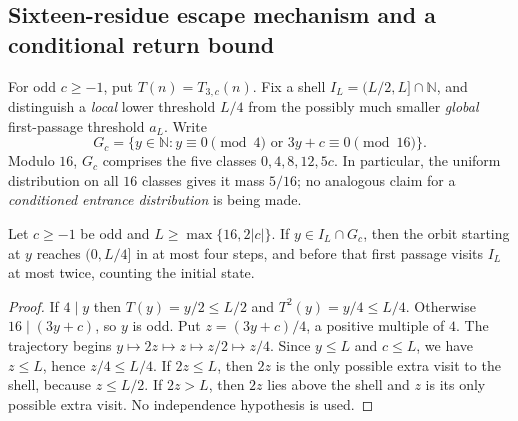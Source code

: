 \subsection{Sixteen-residue escape mechanism and a conditional return bound}
\label{subsec:mod16-escape-candidate}
For odd $c\ge-1$, put $T(n)=T_{3,c}(n)$. Fix a shell
$I_L=(L/2,L]\cap\mathbb N$, and distinguish a \emph{local} lower
threshold $L/4$ from the possibly much smaller \emph{global}
first-passage threshold $a_L$. Write
\[
 G_c=\{y\in\mathbb N:y\equiv0\pmod4\text{ or }
                 3y+c\equiv0\pmod{16}\}.
\]
Modulo $16$, $G_c$ comprises the five classes
$0,4,8,12,5c$. In particular, the uniform distribution on all
$16$ classes gives it mass $5/16$; no analogous claim for a
\emph{conditioned entrance distribution} is being made.

\begin{proposition}
\label{prop:mod16-local-escape-candidate}
Let $c\ge-1$ be odd and $L\ge\max\{16,2|c|\}$. If
$y\in I_L\cap G_c$, then the orbit starting at $y$ reaches
$(0,L/4]$ in at most four steps, and before that first passage
visits $I_L$ at most twice, counting the initial state.
\end{proposition}
\begin{proof}
If $4\mid y$ then $T(y)=y/2\le L/2$ and
$T^2(y)=y/4\le L/4$. Otherwise $16\mid(3y+c)$, so $y$ is odd.
Put $z=(3y+c)/4$, a positive multiple of $4$. The trajectory
begins $y\mapsto2z\mapsto z\mapsto z/2\mapsto z/4$.
Since $y\le L$ and $c\le L$, we have $z\le L$, hence
$z/4\le L/4$. If $2z\le L$, then $2z$ is the only possible
extra visit to the shell, because $z\le L/2$. If $2z>L$,
then $2z$ lies above the shell and $z$ is its only possible
extra visit. No independence hypothesis is used.
\end{proof}


